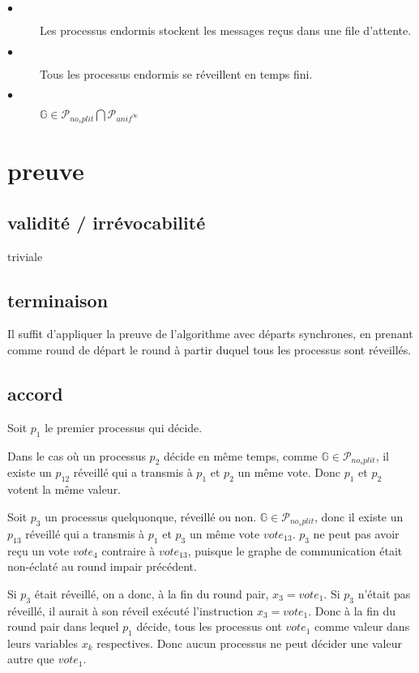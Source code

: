 \documentclass{article}
\begin{document}
\begin{description}

	\item[$\bullet$] Les processus endormis stockent les messages reçus dans une file d'attente.
	\item[$\bullet$] Tous les processus endormis se réveillent en temps fini.
	\item[$\bullet$] $\mathds{G} \in \mathcal{P}_{no_split} \bigcap \mathcal{P}_{unif^\infty}$

\end{description}

\section{preuve}

\subsection{validité / irrévocabilité }

triviale

\subsection{terminaison}

Il suffit d'appliquer la preuve de l'algorithme avec départs synchrones, en prenant comme round de départ le round à partir duquel tous les processus sont réveillés.

\subsection{accord}

Soit $p_1$ le premier processus qui décide.

Dans le cas où un processus $p_2$ décide en même temps, comme $\mathds{G} \in \mathcal{P}_{no_split}$, il existe un $p_{12}$ réveillé qui a transmis à $p_1$ et $p_2$ un même vote. Donc $p_1$ et $p_2$ votent la même valeur.

Soit $p_3$ un processus quelquonque, réveillé ou non. $\mathds{G} \in \mathcal{P}_{no_split}$, donc il existe un $p_{13}$ réveillé qui a transmis à $p_1$ et $p_3$ un même vote $vote_{13}$. $p_3$ ne peut pas avoir reçu un vote $vote_4$ contraire à $vote_{13}$, puisque le graphe de communication était non-éclaté au round impair précédent.

Si $p_3$ était réveillé, on a donc, à la fin du round pair, $x_3 = vote_1$. Si $p_3$ n'était pas réveillé, il aurait à son réveil exécuté l'instruction $x_3 = vote_1$. Donc à la fin du round pair dans lequel $p_1$ décide, tous les processus ont $vote_1$ comme valeur dans leurs variables $x_k$ respectives. Donc aucun processus ne peut décider une valeur autre que $vote_1$.
\end{document}
